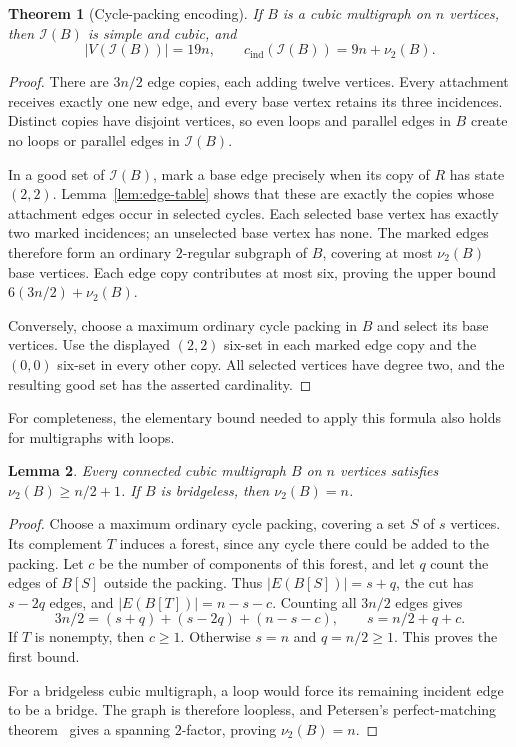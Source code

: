 \documentclass[11pt]{article}
\newtheorem{theorem}{Theorem}[section]
\newtheorem{lemma}[theorem]{Lemma}
\newcommand{\cind}{c_{\mathrm{ind}}}
\begin{document}
\begin{theorem}[Cycle-packing encoding]\label{thm:inflation}
If $B$ is a cubic multigraph on $n$ vertices, then $\mathcal I(B)$
is simple and cubic, and
\[
 |V(\mathcal I(B))|=19n,\qquad
 \cind(\mathcal I(B))=9n+\nu_2(B).
\]
\end{theorem}
\begin{proof}
There are $3n/2$ edge copies, each adding twelve vertices. Every
attachment receives exactly one new edge, and every base vertex
retains its three incidences. Distinct copies have disjoint vertices,
so even loops and parallel edges in $B$ create no loops or parallel
edges in $\mathcal I(B)$.

In a good set of $\mathcal I(B)$, mark a base edge precisely when
its copy of $R$ has state $(2,2)$. Lemma~\ref{lem:edge-table} shows
that these are exactly the copies whose attachment edges occur in
selected cycles. Each selected base vertex has exactly two marked
incidences; an unselected base vertex has none. The marked edges
therefore form an ordinary $2$-regular subgraph of $B$, covering at
most $\nu_2(B)$ base vertices. Each edge copy contributes at most
six, proving the upper bound $6(3n/2)+\nu_2(B)$.

Conversely, choose a maximum ordinary cycle packing in $B$ and
select its base vertices. Use the displayed $(2,2)$ six-set in each
marked edge copy and the $(0,0)$ six-set in every other copy.
All selected vertices have degree two, and the resulting good set
has the asserted cardinality.
\end{proof}

For completeness, the elementary bound needed to apply this formula
also holds for multigraphs with loops.

\begin{lemma}\label{lem:ordinary-packing}
Every connected cubic multigraph $B$ on $n$ vertices satisfies
$\nu_2(B)\geq n/2+1$. If $B$ is bridgeless, then $\nu_2(B)=n$.
\end{lemma}
\begin{proof}
Choose a maximum ordinary cycle packing, covering a set $S$ of
$s$ vertices. Its complement $T$ induces a forest, since any cycle
there could be added to the packing. Let $c$ be the number of
components of this forest, and let $q$ count the edges of $B[S]$
outside the packing. Thus $|E(B[S])|=s+q$, the cut has $s-2q$
edges, and $|E(B[T])|=n-s-c$. Counting all $3n/2$ edges gives
\[
 3n/2=(s+q)+(s-2q)+(n-s-c),\qquad s=n/2+q+c.
\]
If $T$ is nonempty, then $c\geq1$. Otherwise $s=n$ and
$q=n/2\geq1$. This proves the first bound.

For a bridgeless cubic multigraph, a loop would force its remaining
incident edge to be a bridge. The graph is therefore loopless, and
Petersen's perfect-matching theorem~\cite{Petersen} gives a spanning
$2$-factor, proving $\nu_2(B)=n$.
\end{proof}
\end{document}
